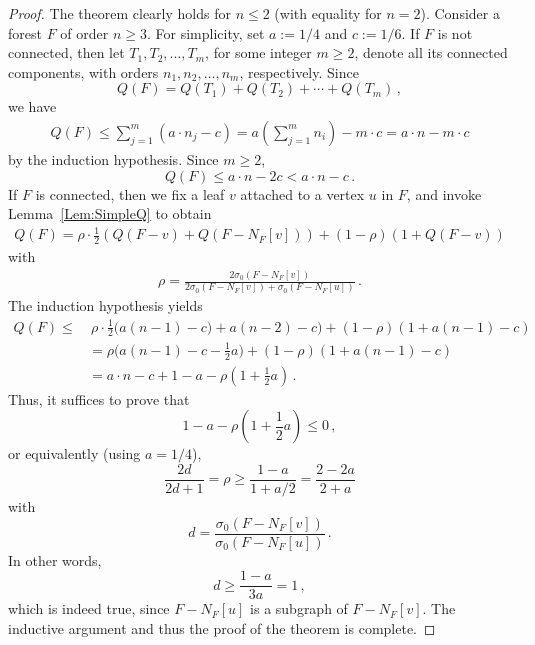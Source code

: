 \documentclass[a4paper,12pt]{amsart}
\begin{document}
\begin{proof}
The theorem clearly holds for $n\leq 2$ (with equality for $n=2$). Consider a forest $F$ of order $n\geq3$. For simplicity, set $a:=1/4$ and $c:=1/6$. If $F$ is not connected, then let $T_1, T_2, \ldots, T_m$, for some integer $m\geq 2$, denote all its connected components, with orders $n_1,n_2,\ldots,n_m$, respectively. Since
$$Q(F)=Q(T_1)+Q(T_2)+\cdots + Q(T_m)\,,$$ we have
\begin{align*}
Q(F)\leq \sum_{j=1}^m (a\cdot n_j-c)= a \left(\sum_{j=1}^m n_i\right) - m \cdot c = a\cdot n - m\cdot c
\end{align*}
by the induction hypothesis. Since $m\geq 2$, 
$$ Q(F) \leq a\cdot n -2c <  a\cdot n - c\,.$$
If $F$ is connected, then we fix a leaf $v$ attached to a vertex $u$ in $F$, and invoke Lemma~\ref{Lem:SimpleQ} to obtain
\begin{align*}
    Q(F)=\rho \cdot \frac{1}{2} (Q(F-v)+Q(F-N_F[v])) + (1-\rho)(1+Q(F-v))
\end{align*}
with 
\begin{align*}
    \rho=\frac{2\sigma_0(F-N_F[v])}{2\sigma_0(F-N_F[v])+\sigma_0(F-N_F[u])}\,.
\end{align*}
The induction hypothesis yields
\begin{align*}
    Q(F)\leq & ~ \rho \cdot \frac{1}{2} \big( a(n-1)-c)  + a(n-2)-c \big) + (1-\rho)(1+ a (n-1) -c )\\
    &= \rho \big(a(n-1)-c -\frac{1}{2}a \big)  + (1-\rho)(1+ a (n-1) -c )\\
    &= a\cdot n - c + 1-a -\rho \left(1+\frac{1}{2}a\right)\,.
\end{align*}
Thus, it suffices to prove that 
$$1-a -\rho \left(1+\frac{1}{2}a \right) \leq 0\,,$$ or equivalently (using $a=1/4$),
$$ \frac{2d}{2d+1}=\rho \geq \frac{1-a}{1+a/2}=\frac{2-2a}{2+a}$$
with 
$$d=\frac{\sigma_0(F-N_F[v])}{\sigma_0(F-N_F[u])}\,.$$
In other words, 
$$d \geq \frac{1-a}{3a}=1\,,$$
which is indeed true, since $F-N_F[u]$ is a subgraph of $F-N_F[v]$. The inductive argument and thus the proof of the theorem is complete.
\end{proof}


\bigskip
%
\end{document}
